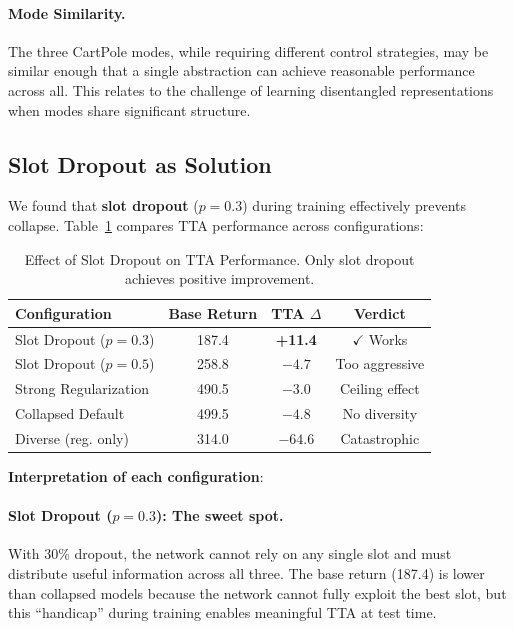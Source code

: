 \documentclass{article}
\begin{document}
\paragraph{Mode Similarity.} The three CartPole modes, while requiring different control strategies, may be similar enough that a single abstraction can achieve reasonable performance across all. This relates to the challenge of learning disentangled representations \citep{locatello2020object} when modes share significant structure.

\subsection{Slot Dropout as Solution}

We found that \textbf{slot dropout} ($p=0.3$) during training effectively prevents collapse. Table~\ref{tab:slot_dropout} compares TTA performance across configurations:

\begin{table}[h]
\centering
\caption{Effect of Slot Dropout on TTA Performance. Only slot dropout achieves positive improvement.}
\label{tab:slot_dropout}
\begin{tabular}{@{}lccc@{}}
\toprule
\textbf{Configuration} & \textbf{Base Return} & \textbf{TTA $\Delta$} & \textbf{Verdict} \\
\midrule
Slot Dropout ($p=0.3$) & 187.4 & \textbf{+11.4} & $\checkmark$ Works \\
Slot Dropout ($p=0.5$) & 258.8 & $-4.7$ & Too aggressive \\
Strong Regularization & 490.5 & $-3.0$ & Ceiling effect \\
Collapsed Default & 499.5 & $-4.8$ & No diversity \\
Diverse (reg. only) & 314.0 & $-64.6$ & Catastrophic \\
\bottomrule
\end{tabular}
\end{table}

\textbf{Interpretation of each configuration}:

\paragraph{Slot Dropout ($p=0.3$): The sweet spot.} With 30\% dropout, the network cannot rely on any single slot and must distribute useful information across all three. The base return (187.4) is lower than collapsed models because the network cannot fully exploit the best slot, but this ``handicap'' during training enables meaningful TTA at test time.
\end{document}
